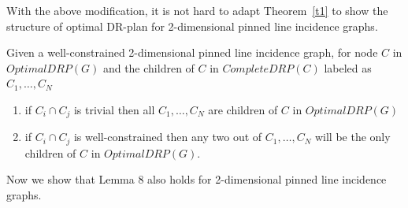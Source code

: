 With the above modification, 
it is not hard to adapt Theorem~\ref{t1} %
to show the structure of optimal DR-plan for 2-dimensional pinned line incidence graphs.


\begin{corollary}
Given a well-constrained 2-dimensional pinned line incidence graph, for node $C$ in $OptimalDRP(G)$ and the children of $C$ in $CompleteDRP(C)$ labeled as $C_1,\ldots,C_N$
\begin{enumerate}
    \item if $C_i \cap C_j$ is trivial then all $C_1,\ldots,C_N$ are children of $C$ in $OptimalDRP(G)$
    \item if $C_i \cap C_j$ is well-constrained then any two out of $C_1,\ldots,C_N$ will be the only children of $C$ in $OptimalDRP(G)$.
\end{enumerate}
\label{cor:pinned}
\end{corollary}

Now we  show that Lemma 8 also holds for 2-dimensional pinned line incidence graphs. 

